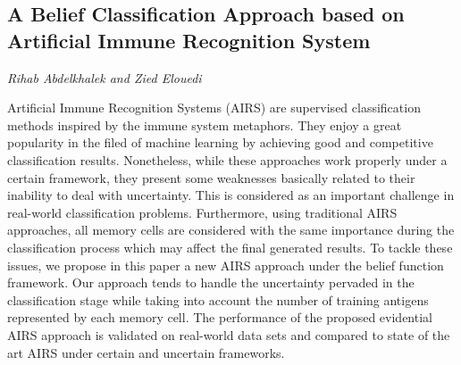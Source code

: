 \documentclass[../booklet.tex]{subfiles}
\begin{document}
\subsection[A Belief Classification Approach based on Artificial Immune Recognition System. {\it Rihab Abdelkhalek and Zied Elouedi}]{A Belief Classification Approach based on Artificial Immune Recognition System}
 

\begin{center}
  {\it Rihab Abdelkhalek and Zied Elouedi}
\end{center}

\vskip 0.8cm








Artificial Immune Recognition Systems (AIRS) are  supervised
classification methods inspired by the immune system metaphors. They enjoy a great popularity in the filed of machine learning by achieving good and competitive classification results. Nonetheless, while these approaches work properly under a certain framework, they
present some weaknesses basically related to their inability to deal with uncertainty. This is considered as an important challenge in real-world classification problems. Furthermore, using traditional AIRS approaches, all memory cells  are considered with the same importance during the classification process which may affect the final generated results. To tackle these issues, we propose in this paper a new AIRS approach under the belief function framework. Our approach tends to handle the uncertainty pervaded in the classification stage while taking into account the number of training antigens represented by each memory
cell. The performance of the proposed
evidential AIRS approach is validated on real-world data sets and compared to state of the art AIRS under certain and uncertain frameworks.



\end{document}
